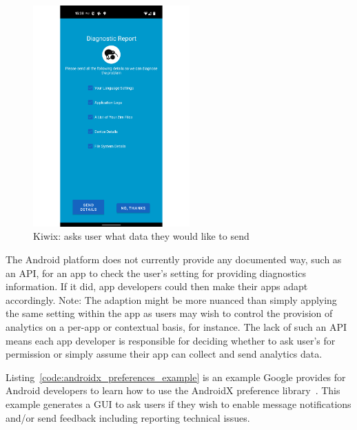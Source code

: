 \begin{figure}
    \centering
    \includegraphics[width=6cm]{images/kiwix/Screenshot-Diagnostic-Report-30-Jun-2022.pdf}
    \caption{Kiwix: asks user what data they would like to send}
    \label{fig:kiwix-diagnostic-report-ui}
\end{figure}

The Android platform does not currently provide any documented way, such as an API, for an app to check the user's setting for providing diagnostics information. If it did, app developers could then make their apps adapt accordingly. Note: The adaption might be more nuanced than simply applying the same setting within the app as users may wish to control the provision of analytics on a per-app or contextual basis, for instance.
The lack of such an API means each app developer is responsible for deciding whether to ask user's for permission or simply assume their app can collect and send analytics data.

Listing~\ref{code:androidx_preferences_example} is an example Google provides for Android developers to learn how to use the AndroidX preference library~. This example generates a GUI to ask users if they wish to enable message notifications and/or send feedback including reporting technical issues. 

